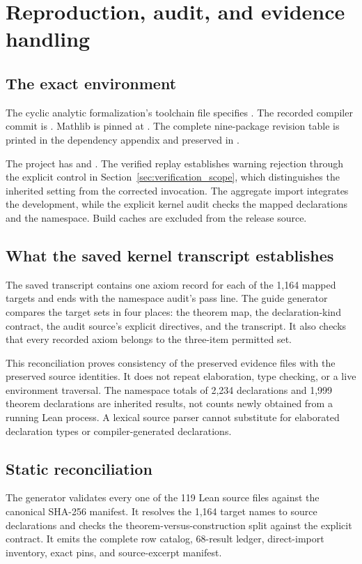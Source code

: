 \section{Reproduction, audit, and evidence handling}
\subsection{The exact environment}
The cyclic analytic formalization's toolchain file specifies . The recorded compiler commit is . Mathlib is pinned at . The complete nine-package revision table is printed in the dependency appendix and preserved in .

The project has  and . The verified replay establishes warning rejection through the explicit control in Section~\ref{sec:verification_scope}, which distinguishes the inherited setting from the corrected invocation. The aggregate import integrates the development, while the explicit kernel audit checks the mapped declarations and the namespace. Build caches are excluded from the release source.

\subsection{What the saved kernel transcript establishes}
The saved transcript contains one axiom record for each of the 1,164 mapped targets and ends with the namespace audit's pass line. The guide generator compares the target sets in four places: the theorem map, the declaration-kind contract, the audit source's explicit directives, and the transcript. It also checks that every recorded axiom belongs to the three-item permitted set.

This reconciliation proves consistency of the preserved evidence files with the preserved source identities. It does not repeat elaboration, type checking, or a live environment traversal. The namespace totals of 2,234 declarations and 1,999 theorem declarations are inherited results, not counts newly obtained from a running Lean process. A lexical source parser cannot substitute for elaborated declaration types or compiler-generated declarations.

\subsection{Static reconciliation}
The generator validates every one of the 119 Lean source files against the canonical SHA-256 manifest. It resolves the 1,164 target names to source declarations and checks the theorem-versus-construction split against the explicit contract. It emits the complete row catalog, 68-result ledger, direct-import inventory, exact pins, and source-excerpt manifest.

